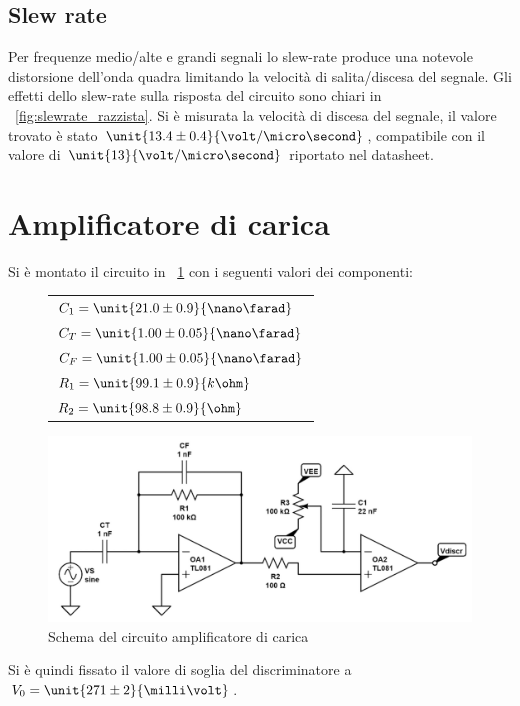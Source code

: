 \documentclass[10pt,a4paper]{article}
\begin{document}
\subsection{Slew rate}
Per frequenze medio/alte e grandi segnali lo slew-rate produce una notevole distorsione dell'onda quadra limitando la velocità di salita/discesa del segnale. Gli effetti dello slew-rate sulla risposta del circuito sono chiari in \figurename{~\ref{fig:slewrate_razzista}}. Si è misurata la velocità di discesa del segnale, il valore trovato è stato $\unit{13.4 \pm 0.4}{\volt /\micro\second}$, compatibile con il valore di $\unit{13}{\volt / \micro\second}$ riportato nel datasheet.

\section{Amplificatore di carica}

Si è montato il circuito in \figurename{~\ref{circuio_ampli}} con i seguenti valori dei componenti:

\begin{figure}[H]
	\begin{minipage}{0.3\textwidth}
		\centering
		\begin{tabular}{l}
			$C_1 = \unit{21.0 \pm 0.9}{\nano\farad}$  \\ 
			$C_T = \unit{1.00 \pm 0.05}{\nano\farad}$ \\
			$C_F = \unit{1.00 \pm 0.05}{\nano\farad}$ \\
			$R_1 = \unit{99.1 \pm 0.9}{k\ohm}$  \\
			$R_2 = \unit{98.8 \pm 0.9}{\ohm}$
		\end{tabular}
	\end{minipage}
	\begin{minipage}{0.7\textwidth}
		\centering
		\includegraphics[width=\textwidth]{../circuiti/charge_amplifier.jpg}
		\caption{Schema del circuito amplificatore di carica}
		\label{circuio_ampli}
	\end{minipage}
\end{figure}
 Si è quindi fissato il valore di soglia del discriminatore a $V_0 = \unit{271 \pm 2}{\milli\volt}$.
\end{document}
